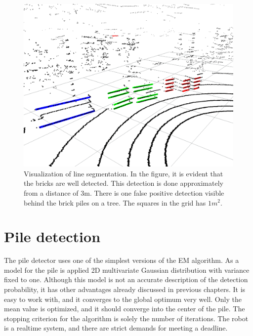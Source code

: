 \begin{figure}[H]
\centering
\includegraphics[scale=0.43]{fig/segments}
\caption[Line segmentation visualization]{Visualization of line segmentation. In the figure, it is evident that the bricks are well detected. This detection is done approximately from a distance of $3$m. There is one false positive detection visible behind the brick piles on a tree. The squares in the grid has $1\si{m}^2$.}
\label{fig:segments}
\end{figure}


\section{Pile detection}
\label{sec:pile_detector}
The pile detector uses one of the simplest versions of the EM algorithm. As a model for the pile is applied 2D multivariate Gaussian distribution with variance fixed to one. Although this model is not an accurate description of the detection probability, it has other advantages already discussed in previous chapters. It is easy to work with, and it converges to the global optimum very well. Only the mean value is optimized, and it should converge into the center of the pile. The stopping criterion for the algorithm is solely the number of iterations. The robot is a realtime system, and there are strict demands for meeting a deadline. 

